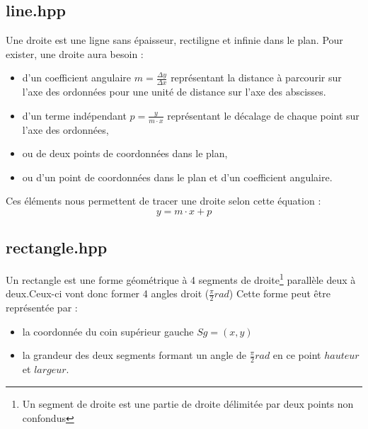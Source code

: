 \documentclass[a4paper,11pt]{report}
\begin{document}
\subsection[Droite]{line.hpp}
\begin{center}
\end{center}
Une droite est une ligne sans épaisseur, rectiligne et infinie dans le plan. 
Pour exister, une droite aura besoin :
\begin{itemize}
	\item d'un coefficient angulaire $m = \frac{\Delta y}{\Delta x}$
		représentant la distance à parcourir sur l'axe des ordonnées pour une unité de
		distance sur l'axe des abscisses.
	\item d'un terme indépendant $p = \frac{y}{m \cdot x}$ représentant le décalage de chaque point
		sur l'axe des ordonnées,
	\item ou de deux points de coordonnées dans le plan,
	\item ou d'un point de coordonnées dans le plan et d'un coefficient
		angulaire.
\end{itemize}
Ces éléments nous permettent de tracer une droite selon cette équation :
$$ y = m \cdot x + p $$

\subsection[Rectangle]{rectangle.hpp}
\begin{center}
\end{center}
Un rectangle est une forme géométrique à 4 segments de droite\footnote{Un
	segment de droite est une partie de droite délimitée par deux points non
confondus} 
parallèle deux à deux.Ceux-ci vont donc former 4 angles droit ($\frac{\pi}{2} rad$)
Cette forme peut être représentée par :
\begin{itemize}
	\item la coordonnée du coin supérieur gauche $Sg = (x, y)$
	\item la grandeur des deux segments formant un angle de $\frac{\pi}{2} rad$
		en ce point $hauteur$ et $largeur$.
\end{itemize}
\end{document}

